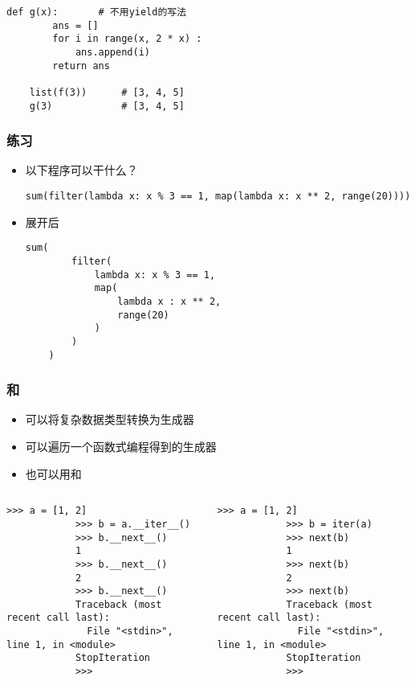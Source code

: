 \begin{CJK}{UTF8}{gbsn}
\begin{frame} [fragile]
\begin{itemize}
\begin{lstlisting}[style=pythonstyle, gobble=4, texcl]
	def g(x):		# 不用yield的写法
		ans = []
		for i in range(x, 2 * x) :
			ans.append(i)
		return ans

	list(f(3))		# [3, 4, 5]
	g(3)			# [3, 4, 5]
	\end{lstlisting}
	\end{itemize}
\end{frame}

\begin{frame} [fragile]
	\frametitle{练习}
	\begin{itemize}
	\item 以下程序可以干什么？
	\begin{lstlisting}[style=pythonstyle, gobble=4, texcl]
	sum(filter(lambda x: x % 3 == 1, map(lambda x: x ** 2, range(20))))
	\end{lstlisting}
	\item 展开后
	\begin{lstlisting}[style=pythonstyle, gobble=4, texcl]
	sum(
		filter(
			lambda x: x % 3 == 1, 
			map(
				lambda x : x ** 2, 
				range(20)
			)
		)
	)
	\end{lstlisting}
	\end{itemize}
\end{frame}

\begin{frame} [fragile]
	\frametitle{和}
	\begin{itemize}
	\item {}可以将复杂数据类型转换为生成器
	\item {}可以遍历一个函数式编程得到的生成器
	\item 也可以用和
	\end{itemize}
	\begin{columns}
		\begin{column}[T]{.5\textwidth}
			\small
			\begin{lstlisting}[style=pythonstyle, gobble=12, texcl]
			>>> a = [1, 2]
			>>> b = a.__iter__()
			>>> b.__next__()
			1
			>>> b.__next__()
			2
			>>> b.__next__()
			Traceback (most recent call last):
			  File "<stdin>", line 1, in <module>
			StopIteration
			>>> 
			\end{lstlisting}
		\end{column}
		\begin{column}[T]{.5\textwidth}
			\small
			\begin{lstlisting}[style=pythonstyle, gobble=12, texcl]
			>>> a = [1, 2]
			>>> b = iter(a)
			>>> next(b)
			1
			>>> next(b)
			2
			>>> next(b)
			Traceback (most recent call last):
			  File "<stdin>", line 1, in <module>
			StopIteration
			>>> 
			\end{lstlisting}
		\end{column}
	\end{columns}
\end{frame}


\end{CJK}
